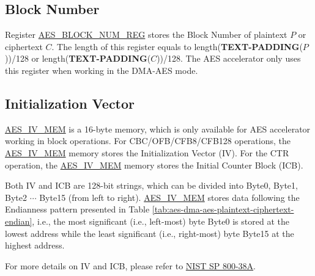\documentclass[main\_\_EN.tex]{subfiles}
\begin{document}
\subsection{Block Number}\label{sec:aes-block-number}

Register \hyperref[regdesc:AESBLOCKNUMREG]{AES\_BLOCK\_NUM\_REG} stores the Block Number of plaintext $P$ or ciphertext $C$. The length of this register equals to length({\bfseries TEXT-PADDING}($P$))/128 or length({\bfseries TEXT-PADDING}($C$))/128. The AES accelerator only uses this register when working in the DMA-AES mode.

\subsection{Initialization Vector}\label{sec:aes-init-vector}

\label{memdesc:AESIVMEM}\hyperref[memdesc:AESIVMEM]{AES\_IV\_MEM} is a 16-byte memory, which is only available for AES accelerator working in block operations. For CBC/OFB/CFB8/CFB128 operations, the \hyperref[memdesc:AESIVMEM]{AES\_IV\_MEM} memory stores the Initialization Vector (IV). For the CTR operation, the \hyperref[memdesc:AESIVMEM]{AES\_IV\_MEM} memory stores the Initial Counter Block (ICB). 

Both IV and ICB are 128-bit strings, which can be divided into Byte0, Byte1, Byte2 \begin{math}\cdots\end{math} Byte15 (from left to right). \hyperref[memdesc:AESIVMEM]{AES\_IV\_MEM} stores data following the Endianness pattern presented in Table \ref{tab:aes-dma-aes-plaintext-ciphertext-endian}, i.e., the most significant (i.e., left-most) byte Byte0 is stored at the lowest address while the least significant (i.e., right-most) byte Byte15 at the highest address. 

For more details on IV and ICB, please refer to \href{https://nvlpubs.nist.gov/nistpubs/Legacy/SP/nistspecialpublication800-38a.pdf}{NIST SP 800-38A}.
\end{document}
